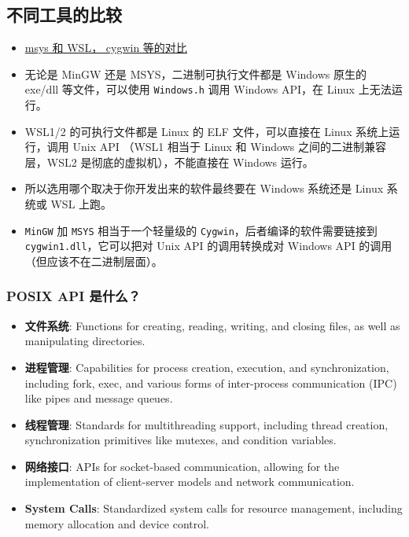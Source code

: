 
\subsection{不同工具的比较}
\begin{itemize}
\item \href{https://www.msys2.org/docs/what-is-msys2/}{msys 和 WSL， cygwin 等的对比}
\item 无论是 MinGW 还是 MSYS，二进制可执行文件都是 Windows 原生的 exe/dll 等文件，可以使用 \verb`Windows.h` 调用 Windows API，在 Linux 上无法运行。
\item WSL1/2 的可执行文件都是 Linux 的 ELF 文件，可以直接在 Linux 系统上运行，调用 Unix API （WSL1 相当于 Linux 和 Windows 之间的二进制兼容层，WSL2 是彻底的虚拟机），不能直接在 Windows 运行。
\item 所以选用哪个取决于你开发出来的软件最终要在 Windows 系统还是 Linux 系统或 WSL 上跑。
\item \verb`MinGW` 加 \verb`MSYS` 相当于一个轻量级的 \verb`Cygwin`，后者编译的软件需要链接到 \verb`cygwin1.dll`，它可以把对 Unix API 的调用转换成对 Windows API 的调用（但应该不在二进制层面）。
\end{itemize}

\subsubsection{POSIX API 是什么？}
\begin{itemize}
\item \textbf{文件系统}: Functions for creating, reading, writing, and closing files, as well as manipulating directories.
\item \textbf{进程管理}: Capabilities for process creation, execution, and synchronization, including fork, exec, and various forms of inter-process communication (IPC) like pipes and message queues.
\item \textbf{线程管理}: Standards for multithreading support, including thread creation, synchronization primitives like mutexes, and condition variables.
\item \textbf{网络接口}: APIs for socket-based communication, allowing for the implementation of client-server models and network communication.
\item \textbf{System Calls}: Standardized system calls for resource management, including memory allocation and device control.
\end{itemize}

